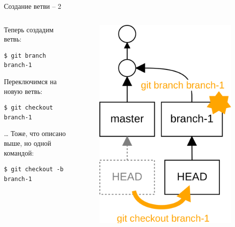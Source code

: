\documentclass[presentation]{beamer}
\begin{document}
\begin{frame}[fragile]{Создание ветви -- 2}
  \begin{columns}
    \begin{column}{.6\textwidth}
      Теперь создадим ветвь:
\begin{verbatim}
$ git branch branch-1
\end{verbatim}

      Переключимся на новую ветвь:
\begin{verbatim}
$ git checkout branch-1
\end{verbatim}
      \ldots{}\newline\newline
      Тоже, что описано выше, но одной командой:
\begin{verbatim}
$ git checkout -b branch-1
\end{verbatim}
      \end{column}
      \begin{column}{.4\textwidth}
        \begin{figure}[htb]
          \centering
          \includegraphics[height=.7\textheight]{git-operation-branch-1}
        \end{figure}
      \end{column}
    \end{columns}
\end{frame}
\end{document}
